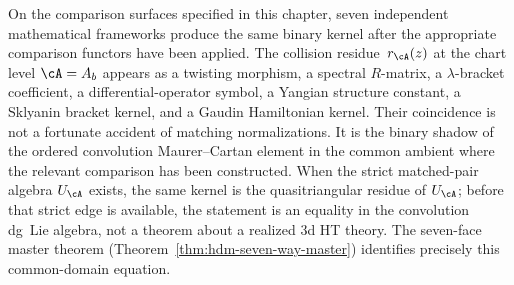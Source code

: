 On the comparison surfaces specified in this chapter, seven independent
mathematical frameworks produce the same binary kernel after the
appropriate comparison functors have been applied. The collision
residue~$r_\cA(z)$ at the chart level $\cA = A_b$ appears as a
twisting morphism, a spectral $R$-matrix, a $\lambda$-bracket
coefficient, a differential-operator symbol, a Yangian structure
constant, a Sklyanin bracket kernel, and a Gaudin Hamiltonian
kernel. Their coincidence is not a fortunate accident of matching
normalizations. It is the binary shadow of the ordered convolution
Maurer--Cartan element in the common ambient where the relevant
comparison has been constructed. When the strict matched-pair algebra
$U_\cA$ exists, the same kernel is the quasitriangular residue of
$U_\cA$; before that strict edge is available, the statement is an
equality in the convolution dg~Lie algebra, not a theorem about a
realized $3$d HT theory. The seven-face master theorem
(Theorem~\ref{thm:hdm-seven-way-master}) identifies precisely this
common-domain equation.

